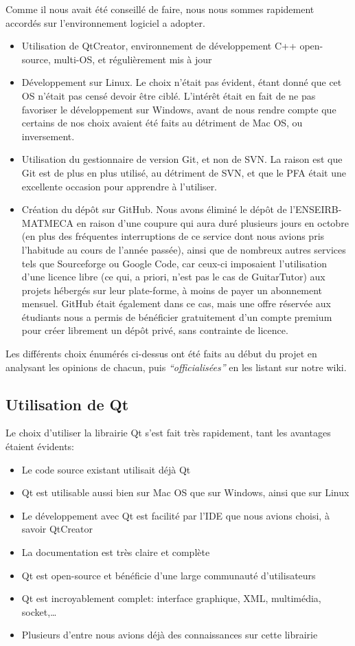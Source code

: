 \documentclass[a4paper,11pt]{article}
\begin{document}
Comme il nous avait été conseillé de faire, nous nous sommes rapidement accordés sur l'environnement logiciel a adopter.
\begin{itemize}
 \item Utilisation de QtCreator, environnement de développement C++ open-source, multi-OS, et régulièrement mis à jour
 \item Développement sur Linux. Le choix n'était pas évident, étant donné que cet OS n'était pas censé devoir être ciblé. L'intérêt était en fait de ne pas favoriser le développement sur Windows, avant de nous rendre compte que certains de nos choix avaient été faits au détriment de Mac OS, ou inversement.
 \item Utilisation du gestionnaire de version Git, et non de SVN. La raison est que Git est de plus en plus utilisé, au détriment de SVN, et que le PFA était une excellente occasion pour apprendre à l'utiliser.
 \item Création du dépôt sur GitHub. Nous avons éliminé le dépôt de l'ENSEIRB-MATMECA en raison d'une coupure qui aura duré plusieurs jours en octobre (en plus des fréquentes interruptions de ce service dont nous avions pris l'habitude au cours de l'année passée), ainsi que de nombreux autres services tels que Sourceforge ou Google Code, car ceux-ci imposaient l'utilisation d'une licence libre (ce qui, a priori, n'est pas le cas de GuitarTutor) aux projets hébergés sur leur plate-forme, à moins de payer un abonnement mensuel. GitHub était également dans ce cas, mais une offre réservée aux étudiants nous a permis de bénéficier gratuitement d'un compte premium pour créer librement un dépôt privé, sans contrainte de licence.
\end{itemize}

Les différents choix énumérés ci-dessus ont été faits au début du projet en analysant les opinions de chacun, puis \textit{``officialisées''} en les listant sur notre wiki.


\subsection{Utilisation de Qt}

Le choix d'utiliser la librairie Qt s'est fait très rapidement, tant les avantages étaient évidents:
\begin{itemize}
 \item Le code source existant utilisait déjà Qt
 \item Qt est utilisable aussi bien sur Mac OS que sur Windows, ainsi que sur Linux
 \item Le développement avec Qt est facilité par l'IDE que nous avions choisi, à savoir QtCreator
 \item La documentation est très claire et complète
 \item Qt est open-source et bénéficie d'une large communauté d'utilisateurs
 \item Qt est incroyablement complet: interface graphique, XML, multimédia, socket,\dots
 \item Plusieurs d'entre nous avions déjà des connaissances sur cette librairie
\end{itemize}
\end{document}
